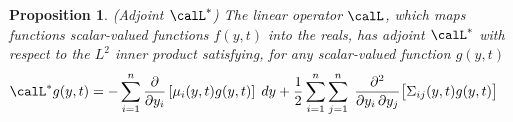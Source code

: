 \documentclass[12pt]{article}
\theoremstyle{plain}
\newtheorem{prop}[thm]{Proposition}
\theoremstyle{definition}
\theoremstyle{remark}
\newtheorem*{rmk}{Remark}
\newcommand{\sumin}{\sum^n_{i=1}}
\newcommand{\sumjn}{\sum^n_{j=1}}
\begin{document}
\begin{prop}\emph{(Adjoint $\calL^*$)}
The linear operator $\calL$, which maps functions scalar-valued
functions $f(y,t)$ into the reals, has \emph{adjoint} $\calL^*$ with
respect to the $L^2$ inner product satisfying, for any scalar-valued
function $g(y,t)$
\begin{align}
  \calL^* g(y,t)
  &=
  -
  \sumin
  \frac{\partial}{\partial y_i}
  \left[
  \mu_i(y,t)
  g(y,t)
  \right]
  \;dy
  +
  \frac{1}{2}
  \sumin
  \sumjn
  \;
  \frac{\partial^2}{\partial y_i\,\partial y_j}
  \big[
  \Sigma_{ij}(y,t)
  g(y,t)
  \big]
  \label{adjointdefn}
\end{align}
\end{prop}
\end{document}
